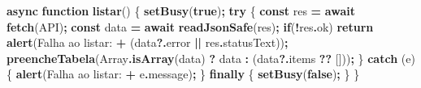 \documentclass[
]{book}
\newenvironment{Shaded}{\begin{snugshade}}{\end{snugshade}}
\newcommand{\AttributeTok}[1]{\textcolor[rgb]{0.13,0.29,0.53}{#1}}
\newcommand{\BuiltInTok}[1]{#1}
\newcommand{\ControlFlowTok}[1]{\textcolor[rgb]{0.13,0.29,0.53}{\textbf{#1}}}
\newcommand{\FunctionTok}[1]{\textcolor[rgb]{0.13,0.29,0.53}{\textbf{#1}}}
\newcommand{\KeywordTok}[1]{\textcolor[rgb]{0.13,0.29,0.53}{\textbf{#1}}}
\newcommand{\NormalTok}[1]{#1}
\newcommand{\OperatorTok}[1]{\textcolor[rgb]{0.81,0.36,0.00}{\textbf{#1}}}
\newcommand{\StringTok}[1]{\textcolor[rgb]{0.31,0.60,0.02}{#1}}
\begin{document}
\begin{Shaded}
\begin{Highlighting}[]
\KeywordTok{async} \KeywordTok{function} \FunctionTok{listar}\NormalTok{() \{}
  \FunctionTok{setBusy}\NormalTok{(}\KeywordTok{true}\NormalTok{)}\OperatorTok{;}
  \ControlFlowTok{try}\NormalTok{ \{}
    \KeywordTok{const}\NormalTok{ res }\OperatorTok{=} \ControlFlowTok{await} \FunctionTok{fetch}\NormalTok{(API)}\OperatorTok{;}
    \KeywordTok{const}\NormalTok{ data }\OperatorTok{=} \ControlFlowTok{await} \FunctionTok{readJsonSafe}\NormalTok{(res)}\OperatorTok{;}
    \ControlFlowTok{if}\NormalTok{(}\OperatorTok{!}\NormalTok{res}\OperatorTok{.}\AttributeTok{ok}\NormalTok{) }\ControlFlowTok{return} \FunctionTok{alert}\NormalTok{(}\StringTok{\textquotesingle{}Falha ao listar: \textquotesingle{}} \OperatorTok{+}\NormalTok{ (data}\OperatorTok{?.}\AttributeTok{error} \OperatorTok{||}\NormalTok{ res}\OperatorTok{.}\AttributeTok{statusText}\NormalTok{))}\OperatorTok{;}
    \FunctionTok{preencheTabela}\NormalTok{(}\BuiltInTok{Array}\OperatorTok{.}\FunctionTok{isArray}\NormalTok{(data) }\OperatorTok{?}\NormalTok{ data }\OperatorTok{:}\NormalTok{ (data}\OperatorTok{?.}\AttributeTok{items} \OperatorTok{??}\NormalTok{ []))}\OperatorTok{;}
\NormalTok{  \} }\ControlFlowTok{catch}\NormalTok{ (e) \{}
    \FunctionTok{alert}\NormalTok{(}\StringTok{\textquotesingle{}Falha ao listar: \textquotesingle{}} \OperatorTok{+}\NormalTok{ e}\OperatorTok{.}\AttributeTok{message}\NormalTok{)}\OperatorTok{;}
\NormalTok{  \} }\ControlFlowTok{finally}\NormalTok{ \{}
    \FunctionTok{setBusy}\NormalTok{(}\KeywordTok{false}\NormalTok{)}\OperatorTok{;}
\NormalTok{  \}}
\NormalTok{\}}


\end{Highlighting}
\end{Shaded}
\end{document}

